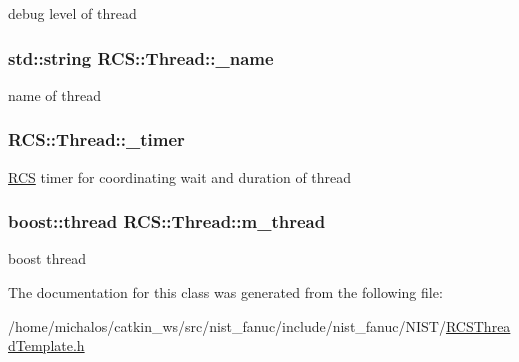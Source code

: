 debug level of thread \hypertarget{classRCS_1_1Thread_a665a238614304950e1c19e7d03e236e1}{
\subsubsection[{\-\_\-name}]{\setlength{\rightskip}{0pt plus 5cm}std\-::string R\-C\-S\-::\-Thread\-::\-\_\-name\hspace{0.3cm}{\ttfamily [protected]}}}\label{classRCS_1_1Thread_a665a238614304950e1c19e7d03e236e1}
name of thread \hypertarget{classRCS_1_1Thread_afddbc109781286f80017468dcccc6b10}{
\subsubsection[{\-\_\-timer}]{ R\-C\-S\-::\-Thread\-::\-\_\-timer\hspace{0.3cm}{\ttfamily [protected]}}}\label{classRCS_1_1Thread_afddbc109781286f80017468dcccc6b10}
\hyperlink{namespaceRCS}{R\-C\-S} timer for coordinating wait and duration of thread \hypertarget{classRCS_1_1Thread_a06b98cfbb4d084f3776ad0ab8731a60a}{
\subsubsection[{m\-\_\-thread}]{\setlength{\rightskip}{0pt plus 5cm}boost\-::thread R\-C\-S\-::\-Thread\-::m\-\_\-thread\hspace{0.3cm}{\ttfamily [protected]}}}\label{classRCS_1_1Thread_a06b98cfbb4d084f3776ad0ab8731a60a}
boost thread 

The documentation for this class was generated from the following file\-:\begin{DoxyCompactItemize}
\item 
/home/michalos/catkin\-\_\-ws/src/nist\-\_\-fanuc/include/nist\-\_\-fanuc/\-N\-I\-S\-T/\hyperlink{RCSThreadTemplate_8h}{R\-C\-S\-Thread\-Template.\-h}\end{DoxyCompactItemize}

